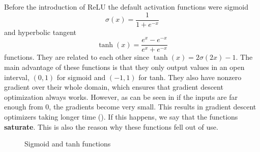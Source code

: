 Before the introduction of ReLU the default activation functions were sigmoid $$\sigma(x)=\frac{1}{1+e^{-x}}$$ and hyperbolic tangent $$\tanh(x)=\frac{e^x-e^{-x}}{e^x+e^{-x}}$$ functions. They are related to each other since $\tanh(x)=2\sigma(2x)-1$. The main advantage of these functions is that they only output values in an open interval, $(0,1)$ for sigmoid and $(-1,1)$ for tanh. They also have nonzero gradient over their whole domain, which ensures that gradient descent optimization always works. However, as can be seen in  if the inputs are far enough from $0$, the gradients become very small. This results in gradient descent optimizers taking longer time (\cite{imagenet_relu}). If this happens, we say that the functions \textbf{saturate}. This is also the reason why these functions fell out of use.
\begin{figure}[t]
\caption{Sigmoid and tanh functions}
\center
\label{sigmoiddiagram}
\end{figure}

